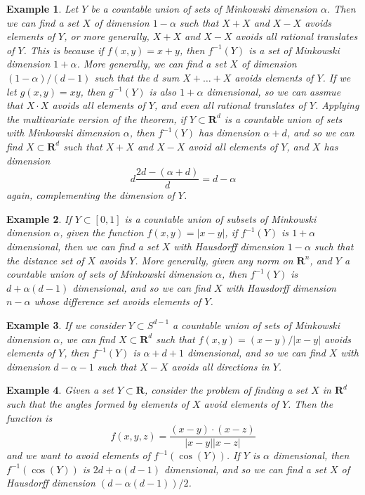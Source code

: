 \documentclass{report}
\theoremstyle{plain}
\newtheorem*{example}{Example}
\theoremstyle{plain}
\begin{document}
\begin{example}
    Let $Y$ be a countable union of sets of Minkowski dimension $\alpha$. Then we can find a set $X$ of dimension $1 - \alpha$ such that $X + X$ and $X - X$ avoids elements of $Y$, or more generally, $X + X$ and $X - X$ avoids all rational translates of $Y$. This is because if $f(x,y) = x + y$, then $f^{-1}(Y)$ is a set of Minkowski dimension $1 + \alpha$. More generally, we can find a set $X$ of dimension $(1 - \alpha)/(d-1)$ such that the $d$ sum $X + \dots + X$ avoids elements of $Y$. If we let $g(x,y) = xy$, then $g^{-1}(Y)$ is also $1 + \alpha$ dimensional, so we can assmue that $X \cdot X$ avoids all elements of $Y$, and even all rational translates of $Y$. Applying the multivariate version of the theorem, if $Y \subset \mathbf{R}^d$ is a countable union of sets with Minkowski dimension $\alpha$, then $f^{-1}(Y)$ has dimension $\alpha + d$, and so we can find $X \subset \mathbf{R}^d$ such that $X + X$ and $X - X$ avoid all elements of $Y$, and $X$ has dimension
    \[ d\frac{2d - (\alpha + d)}{d} = d - \alpha\]
    again, complementing the dimension of $Y$.
\end{example}

\begin{example}
    If $Y \subset [0,1]$ is a countable union of subsets of Minkowski dimension $\alpha$, given the function $f(x,y) = |x - y|$, if $f^{-1}(Y)$ is $1 + \alpha$ dimensional, then we can find a set $X$ with Hausdorff dimension $1 - \alpha$ such that the distance set of $X$ avoids $Y$. More generally, given any norm on $\mathbf{R}^n$, and $Y$ a countable union of sets of Minkowski dimension $\alpha$, then $f^{-1}(Y)$ is $d + \alpha (d - 1)$ dimensional, and so we can find $X$ with Hausdorff dimension $n - \alpha$ whose difference set avoids elements of $Y$.
\end{example}

\begin{example}
    If we consider $Y \subset S^{d-1}$ a countable union of sets of Minkowski dimension $\alpha$, we can find $X \subset \mathbf{R}^d$ such that $f(x,y) = (x - y)/|x-y|$ avoids elements of $Y$, then $f^{-1}(Y)$ is $\alpha + d + 1$ dimensional, and so we can find $X$ with dimension $d-\alpha-1$ such that $X - X$ avoids all directions in $Y$.
\end{example}

\begin{example}
    Given a set $Y \subset \mathbf{R}$, consider the problem of finding a set $X$ in $\mathbf{R}^d$ such that the angles formed by elements of $X$ avoid elements of $Y$. Then the function is
    \[ f(x,y,z) = \frac{(x - y) \cdot (x - z)}{|x - y| |x - z|} \]
    and we want to avoid elements of $f^{-1}(\cos(Y))$. If $Y$ is $\alpha$ dimensional, then $f^{-1}(\cos(Y))$ is $2d + \alpha(d - 1)$ dimensional, and so we can find a set $X$ of Hausdorff dimension $(d - \alpha(d-1))/2$.
\end{example}
\end{document}
